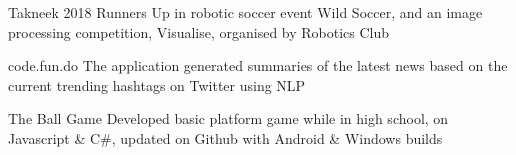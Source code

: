 
\begin{cvmiscs}

  \cvmisc
    {Takneek 2018}
    {Runners Up in robotic soccer event Wild Soccer, and an image processing competition, Visualise, organised by Robotics Club}
  
  \cvmisc
    {code.fun.do}
    {The application generated summaries of the latest news based on the current trending hashtags on Twitter using NLP}

  \cvmisc
    {The Ball Game}
    {Developed basic platform game while in high school, on Javascript \& C\#, updated on Github with Android \& Windows builds}

\end{cvmiscs}